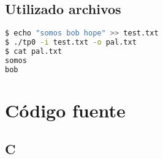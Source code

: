 \documentclass[10pt,a4paper]{article}
\begin{document}
\subsection{Utilizado archivos}

\begin{lstlisting}[language=bash]
$ echo "somos bob hope" >> test.txt
$ ./tp0 -i test.txt -o pal.txt
$ cat pal.txt 
somos
bob
\end{lstlisting}

\newpage

\section{Código fuente}

\subsection{C}

\lstset{
	breaklines=true,
  	basicstyle=\footnotesize,
	numbers=left,
	captionpos=b,
	showspaces=false,
	title=\lstname
}
\end{document}
